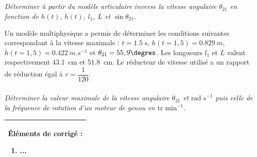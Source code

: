 \documentclass[10pt,fleqn]{article} %
\begin{document}
\begin{multicols}{2}
\subparagraph{}\textit{Déterminer à partir du modèle articulaire inverse la vitesse angulaire 
$\theta_{21}$ en fonction de $h(t)$, $\dot{h}(t)$, $l_1$, $L$ et $\sin\theta_{21}$.}
\ifprof
\begin{corrige}
\end{corrige}
\else
\fi

Un modèle multiphysique a permis de déterminer les conditions suivantes correspondant à la vitesse maximale : $t=\SI{1,5}{s}$, $h(t=1,5)=\SI{0,829}{m}$, $\dot{h}(t=1,5)=\SI{0,422}{m.s^{-1}}$ et $\theta_{21} = 55,9\degres$. Les longueurs $l_1$ et $L$ valent
respectivement \SI{43,1}{cm} et \SI{51,8}{cm}. Le réducteur de vitesse utilisé a un rapport de réduction égal à $r=\dfrac{1}{120}$.

\subparagraph{}\textit{Déterminer la valeur maximale de la vitesse angulaire $\dot{\theta}_{21}$ et $\text{rad s}^{-1}$ puis celle de la fréquence de rotation d’un moteur de genou en $\text{tr min}^{-1}$.}
\ifprof
\begin{corrige}
\end{corrige}
\else
\fi



\footnotesize
\begin{tabular}{|p{.5\linewidth}|}
\hline
Éléments de corrigé :
\begin{enumerate}
\item ...
\end{enumerate} \\
\hline
\end{tabular}
\normalsize
\ifprof
\else
\end{multicols}
\fi

\end{document}
